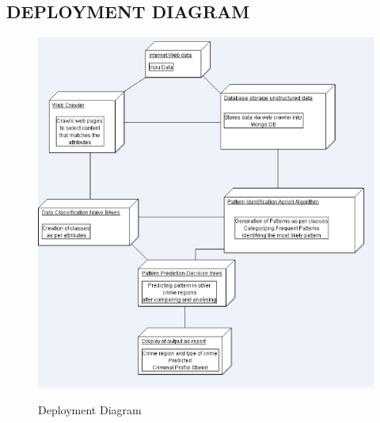\documentclass[12pt]{extreport}
\begin{document}
    \subsection{DEPLOYMENT DIAGRAM}
     \begin{figure}[H]
  \centering
  \includegraphics[scale=0.75]{DEPLOYDIAGRAM.png}\\
  \caption{Deployment Diagram}
  \end{figure}
  \pagebreak  
\end{document}
